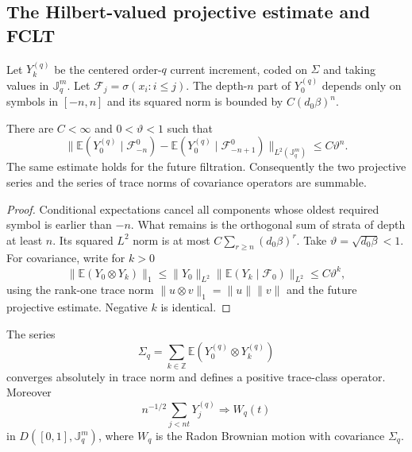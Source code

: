 \subsection{The Hilbert-valued projective estimate and FCLT}

Let $Y_k^{(q)}$ be the centered order-$q$ current increment, coded on
$\Sigma$ and taking values in $\mathbb J_q^m$.  Let
$\mathcal F_j=\sigma(x_i:i\le j)$.  The depth-$n$ part of $Y_0^{(q)}$ depends
only on symbols in $[-n,n]$ and its squared norm is bounded by
$C(d_0\beta)^n$.

\begin{lemma}
\label{lem:r21-a1-projective}
There are $C<\infty$ and $0<\vartheta<1$ such that
\[
 \|\mathbb E(Y_0^{(q)}\mid\mathcal F_{-n}^0)
 -\mathbb E(Y_0^{(q)}\mid\mathcal F_{-n+1}^0)\|_{L^2(\mathbb J_q^m)}
 \le C\vartheta^n.
\]
The same estimate holds for the future filtration.  Consequently the two
projective series and the series of trace norms of covariance operators are
summable.
\end{lemma}

\begin{proof}
Conditional expectations cancel all components whose oldest required symbol
is earlier than $-n$.  What remains is the orthogonal sum of strata of depth
at least $n$.  Its squared $L^2$ norm is at most
$C\sum_{r\ge n}(d_0\beta)^r$.  Take
$\vartheta=\sqrt{d_0\beta}<1$.  For covariance, write for $k>0$
\[
 \|\mathbb E(Y_0\otimes Y_k)\|_1
 \le \|Y_0\|_{L^2}
      \|\mathbb E(Y_k\mid\mathcal F_0)\|_{L^2}
 \le C\vartheta^k,
\]
using the rank-one trace norm $\|u\otimes v\|_1=\|u\|\|v\|$ and the future
projective estimate.  Negative $k$ is identical.
\end{proof}

\begin{theorem}
\label{thm:r21-a1-fclt}
The series
\[
 \Sigma_q=\sum_{k\in\mathbb Z}
 \mathbb E(Y_0^{(q)}\otimes Y_k^{(q)})
\]
converges absolutely in trace norm and defines a positive trace-class
operator.  Moreover
\[
 n^{-1/2}\sum_{j<nt}Y_j^{(q)}
 \Longrightarrow W_q(t)
\]
in $D([0,1],\mathbb J_q^m)$, where $W_q$ is the Radon Brownian motion with
covariance $\Sigma_q$.
\end{theorem}

